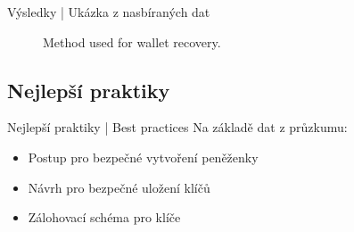 \documentclass{beamer}
\begin{document}
\begin{darkframes}
\begin{frame}{Výsledky | Ukázka z nasbíraných dat}
\begin{center}
\begin{figure}[H]
\caption{Method used for wallet recovery.}
\label{chart:recoverymethod}\end{figure}\end{center}    
     
    \end{frame}
    
    
    \subsection{Nejlepší praktiky}
    \begin{frame}{Nejlepší praktiky | Best practices}
     Na základě dat z průzkumu:
     \begin{itemize}
     \item Postup pro bezpečné vytvoření peněženky
     \item Návrh pro bezpečné uložení klíčů
     \item Zálohovací schéma pro klíče
     \end{itemize}
    \end{frame}
  \end{darkframes}
  
    
\end{document}
